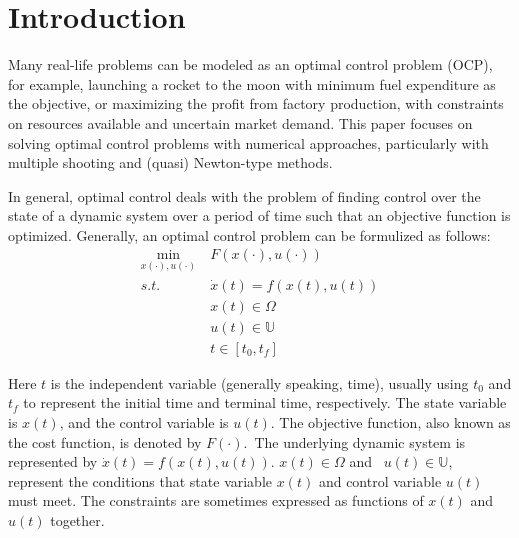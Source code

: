 \documentclass  [
  paper    = a4,
  BCOR     = 10mm,
  twoside,
  fontsize = 12pt,
  fleqn,
  toc      = bibnumbered,
  toc      = listofnumbered,
  numbers  = noendperiod,
  headings = normal,
  listof   = leveldown,
  version  = 3.03
]                                       {scrreprt}
\newcommand{\<}{\langle}
\renewcommand{\>}{\rangle}
\begin{document}
   
   \tableofcontents
    \let\clearpage\relax
   \newpage
   
   
 \chapter{Introduction}  
 \label{Chapter1}
Many real-life problems can be modeled as an optimal control problem (OCP), for example, launching a rocket to the moon with minimum fuel expenditure as the objective, or maximizing the profit from factory production, with constraints on resources available and uncertain market demand. This paper focuses on solving optimal control problems with numerical approaches, particularly with multiple shooting and (quasi) Newton-type methods. 

In general, optimal control deals with the problem of finding control over the state of a dynamic system over a period of time such that an objective function is optimized. Generally, an optimal control problem can be formulized as follows: 
      \begin{equation}
   	\begin{aligned}
   	\underset{x(\cdot), u(\cdot)}{\text{min}}  \ &  F(x(\cdot), u(\cdot)) \\
   		s.t.\ \  &  \dot{x} (t) = f(x(t), u(t))\\ 
   		        & x(t) \in \Omega \\
   		          & u(t) \in \mathbb{U}  \\
   		          & t \in [t_0, t_f]
   	\end{aligned}
   	\label{P1_OPH}
   \end{equation}
 
 
Here $t$ is the independent variable (generally speaking, time), usually using $t_0$ and $t_f$ to represent the initial time and terminal time, respectively. The state variable is $x(t)$, and the control variable is $u(t)$. The objective function, also known as the cost function, is denoted by $F(\cdot)$. The underlying dynamic system is represented by $\dot{x} (t) = f(x(t), u(t))$. $x(t) \in \Omega$ and  $u(t) \in \mathbb{U}$, represent the conditions that state variable $x(t)$ and control variable $u(t)$ must meet. The constraints are sometimes expressed as functions of $x(t)$ and $u(t)$  together.
\end{document}
